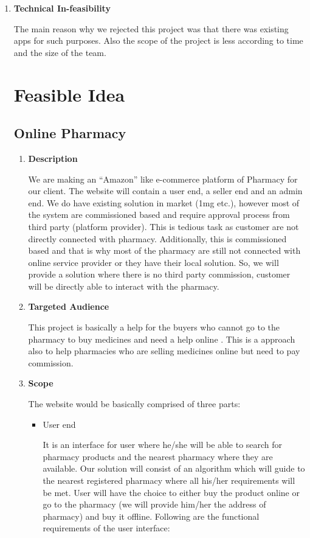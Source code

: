 \documentclass[fleqn,10pt]{../SelfArx} %
\begin{document}
\begin{enumerate}
\item \textbf{ Technical In-feasibility }

The main reason why we rejected this project was that there was existing apps for such purposes. Also the scope of the project is less according to time and the size of the team. 

\section{Feasible Idea}

\subsection{Online Pharmacy}

\vspace{0.5cm}
\begin{enumerate}
\item \textbf{Description}

We are making an “Amazon” like e-commerce platform of Pharmacy for our
client. The website will contain a user end, a seller end and an admin end. We
do have existing solution in market (1mg etc.), however most of the system are
commissioned based and require approval process from third party (platform
provider). This is tedious task as customer are not directly connected with
pharmacy. Additionally, this is commissioned based and that is why most of
the pharmacy are still not connected with online service provider or they have
their local solution. So, we will provide a solution where there is no third party
commission, customer will be directly able to interact with the pharmacy.
\item \textbf{Targeted Audience}

This project is basically a help for the buyers who cannot go to the pharmacy to buy medicines and need a help online . This is a approach also to help pharmacies who are selling medicines online but need to pay commission.

\item \textbf{Scope}

The website would be basically comprised of three parts:
\begin{itemize}
    \item User end
   
It is an interface for user where he/she will be able to search for pharmacy products and the nearest pharmacy where they are available. Our solution will consist of an algorithm which will guide to the nearest registered pharmacy where all his/her requirements will be met. User will have the choice to either buy the product online or go to the pharmacy (we will provide him/her the address of pharmacy) and buy it offline. Following are the functional requirements of the user interface:


\end{itemize}
\end{enumerate}
\end{enumerate}
\end{document}
